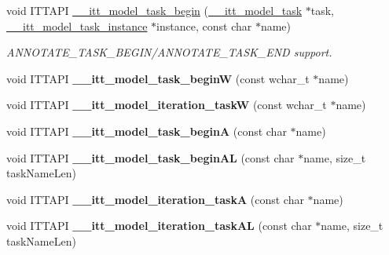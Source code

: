 \begin{DoxyCompactItemize}
\item 
void I\+T\+T\+A\+P\+I \hyperlink{group__model_ga5ed326c42962f58017287e207bda47c1}{\+\_\+\+\_\+itt\+\_\+model\+\_\+task\+\_\+begin} (\hyperlink{group__model_ga96b1dc87978dfc08d2f7740f9d3d2196}{\+\_\+\+\_\+itt\+\_\+model\+\_\+task} $\ast$task, \hyperlink{group__model_ga649e02ad732b5bfc895a239353d09588}{\+\_\+\+\_\+itt\+\_\+model\+\_\+task\+\_\+instance} $\ast$instance, const char $\ast$name)
\begin{DoxyCompactList}\small\item\em A\+N\+N\+O\+T\+A\+T\+E\+\_\+\+T\+A\+S\+K\+\_\+\+B\+E\+G\+I\+N/\+A\+N\+N\+O\+T\+A\+T\+E\+\_\+\+T\+A\+S\+K\+\_\+\+E\+N\+D support. \end{DoxyCompactList}\item 
\hypertarget{group__model_gaf1d8632bde2bef71d4fc01a5b0ebd76f}{}void I\+T\+T\+A\+P\+I {\bfseries \+\_\+\+\_\+itt\+\_\+model\+\_\+task\+\_\+begin\+W} (const wchar\+\_\+t $\ast$name)\label{group__model_gaf1d8632bde2bef71d4fc01a5b0ebd76f}

\item 
\hypertarget{group__model_gace3b1a76c4b0e2a3d3ef546c1ee1814e}{}void I\+T\+T\+A\+P\+I {\bfseries \+\_\+\+\_\+itt\+\_\+model\+\_\+iteration\+\_\+task\+W} (const wchar\+\_\+t $\ast$name)\label{group__model_gace3b1a76c4b0e2a3d3ef546c1ee1814e}

\item 
\hypertarget{group__model_gad2ba1c00072ec87b59c66cf77c9bdcc3}{}void I\+T\+T\+A\+P\+I {\bfseries \+\_\+\+\_\+itt\+\_\+model\+\_\+task\+\_\+begin\+A} (const char $\ast$name)\label{group__model_gad2ba1c00072ec87b59c66cf77c9bdcc3}

\item 
\hypertarget{group__model_ga63fb5d6e81b9e9fc7632778fcd23dcc4}{}void I\+T\+T\+A\+P\+I {\bfseries \+\_\+\+\_\+itt\+\_\+model\+\_\+task\+\_\+begin\+A\+L} (const char $\ast$name, size\+\_\+t task\+Name\+Len)\label{group__model_ga63fb5d6e81b9e9fc7632778fcd23dcc4}

\item 
\hypertarget{group__model_gabbd738c639cccc13b9c2cf6919ceb9d2}{}void I\+T\+T\+A\+P\+I {\bfseries \+\_\+\+\_\+itt\+\_\+model\+\_\+iteration\+\_\+task\+A} (const char $\ast$name)\label{group__model_gabbd738c639cccc13b9c2cf6919ceb9d2}

\item 
\hypertarget{group__model_ga41daab15af2f1133454d2640ff305d51}{}void I\+T\+T\+A\+P\+I {\bfseries \+\_\+\+\_\+itt\+\_\+model\+\_\+iteration\+\_\+task\+A\+L} (const char $\ast$name, size\+\_\+t task\+Name\+Len)\label{group__model_ga41daab15af2f1133454d2640ff305d51}


\end{DoxyCompactItemize}
